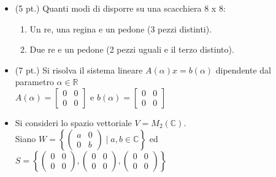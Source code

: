 \documentclass[12pt,a4paper]{article}
\begin{document}
\begin{itemize}[label=$\circ$]
    \item (5 pt.) Quanti modi di disporre su una scacchiera 8 x 8:
    \begin{enumerate}
        \item Un re, una regina e un pedone (3 pezzi distinti).
        \item Due re e un pedone (2 pezzi uguali e il terzo distinto).
    \end{enumerate}

    \item (7 pt.) Si risolva il sistema lineare \( A(\alpha)x = b(\alpha) \) dipendente dal parametro $\alpha \in \mathbb{R}$ \\ 

    \(
        A(\alpha) =
        \begin{bmatrix}
            0 & 0 \\
            0 & 0
        \end{bmatrix}
    \)
        e 
    \(
        b(\alpha)=
        \begin{bmatrix}
            0 & 0 \\
            0 & 0
        \end{bmatrix}
    \)

    \item Si consideri lo spazio vettoriale \( V = M_2( \mathbb{C}) \). \\ 

    Siano 
    \(
        W = 
        \left\{ 
            \begin{pmatrix}
                a & 0 \\
                0 & b
            \end{pmatrix} 
            \mid a,b \in \mathbb{C}
        \right\}
    \)
        ed  
    \(  
        S = 
        \left\{ 
            \begin{pmatrix}
                0 & 0 \\
                0 & 0
            \end{pmatrix} 
            ,
            \begin{pmatrix}
                0 & 0 \\
                0 & 0
            \end{pmatrix} 
            ,
            \begin{pmatrix}
                0 & 0 \\
                0 & 0
            \end{pmatrix}
        \right\}
    \)


\end{itemize}
\end{document}
